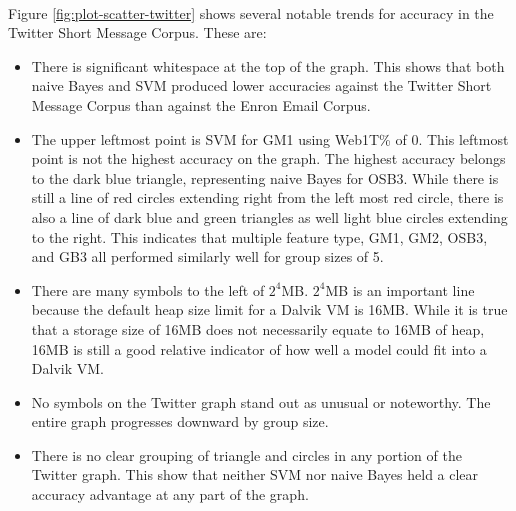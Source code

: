 \paragraph*{} Figure \ref{fig:plot-scatter-twitter} shows several notable trends for accuracy in the Twitter Short Message Corpus.  These are:
	\begin{itemize}
		\item There is significant whitespace at the top of the graph.  This shows that both naive Bayes and SVM produced lower accuracies against the Twitter Short Message Corpus than against the Enron Email Corpus.
		\item The upper leftmost point is SVM for GM1 using Web1T\% of 0.  This leftmost point is not the highest accuracy on the graph.  The highest accuracy belongs to the dark blue triangle, representing naive Bayes for OSB3.  While there is still a line of red circles extending right from the left most red circle, there is also a line of dark blue and green triangles as well light blue circles extending to the right.  This indicates that multiple feature type, GM1, GM2, OSB3, and GB3 all performed similarly well for group sizes of 5.
		\item There are many symbols to the left of $2^4$MB. $2^4$MB is an important line because the default heap size limit for a Dalvik VM is 16MB.  While it is true that a storage size of 16MB does not necessarily equate to 16MB of heap, 16MB is still a good relative indicator of how well a model could fit into a Dalvik VM.
		\item No symbols on the Twitter graph stand out as unusual or noteworthy.  The entire graph progresses downward by group size.
		\item There is no clear grouping of triangle and circles in any portion of the Twitter graph. This show that neither SVM nor naive Bayes held a clear accuracy advantage at any part of the graph.
		
	\end{itemize}

